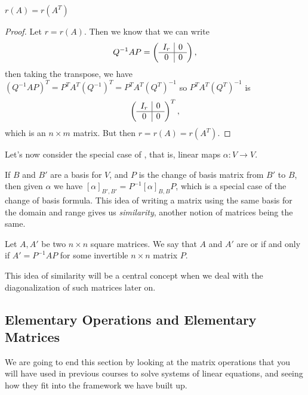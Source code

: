 \begin{theorem}
    $r(A) = r(A^T)$
\end{theorem}
\begin{proof}
    Let $r = r(A)$. Then we know that 
    we can write
    $$
    Q^{-1}AP = \left(\begin{array}{ c | c }
        I_r & 0 \\
        \hline
        0 & 0
      \end{array}\right),
    $$
    then taking the transpose, we have $(Q^{-1}AP)^T = P^T A^T (Q^{-1})^T = P^T A^T (Q^T)^{-1}$
    so $P^T A^T (Q^T)^{-1}$ is 
    $$
    \left(\begin{array}{ c | c }
        I_r & 0 \\
        \hline
        0 & 0
      \end{array}\right)^T,
    $$
    which is an $n \times m$ matrix. But then $r = r(A) = r(A^T)$.
\end{proof}

Let's now consider the special case of , that is, linear maps $\alpha: V \rightarrow V$.

If $B$ and $B'$ are a basis for $V$, and $P$ is the change of basis matrix from $B'$ to $B$, then given $\alpha$ we have $[\alpha]_{B', B'} = P^{-1}[\alpha]_{B, B}P$, which is a special case of the change of basis formula.
This idea of writing a matrix using the same basis for the domain and range gives us \emph{similarity}, another notion of matrices being the same.

\begin{definition}
    Let $A, A'$ be two $n \times n$ square matrices. We say that $A$ and $A'$ are  or  if and only if  $A' = P^{-1} A P$ for some invertible $n \times n$ matrix $P$.
\end{definition}

This idea of similarity will be a central concept when we deal with the diagonalization of such matrices later on.

\subsection{Elementary Operations and Elementary Matrices}

We are going to end this section by looking at the matrix operations that you will have used in previous courses to solve systems of linear equations, and seeing how they fit into the framework we have built up.

